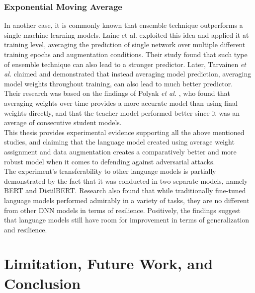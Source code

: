 \documentclass[%
	BCOR=8mm, %
	DIV=12,
	toc=bibliography, %
	toc=listof, %
	oneside, %
	egregdoesnotlikesansseriftitles, %
	]{scrbook}
\begin{document}
\subsection{Exponential Moving Average}
In another case, it is commonly known that ensemble technique outperforms a single machine learning models. Laine et al. \cite{laine_temporal_2017} exploited this idea and applied it at training level, averaging the prediction of single network over multiple different training epochs and augmentation conditions. Their study found that such type of ensemble technique can also lead to a stronger predictor. Later,  Tarvainen \textit{et al.}\cite{tarvainen_mean_2018} claimed and demonstrated that instead averaging model prediction, averaging model weights throughout training, can also lead to much better predictor. \\
Their research was based on the findings of Polyak \textit{et al.} \cite{polyak_acceleration_1992}, who found that averaging weights over time provides a more accurate model than using final weights directly, and that the teacher model performed better since it was an average of consecutive student models. \\
This thesis provides experimental evidence supporting all the above mentioned studies, and claiming that the language model created using average weight assignment and data augmentation creates a comparatively better and more robust model when it comes to defending against adversarial attacks.\\
The experiment's transferability to other language models is partially demonstrated by the fact that it was conducted in two separate models, namely BERT and DistilBERT. Research also found that while traditionally fine-tuned language models performed admirably in a variety of tasks, they are no different from other DNN models in terms of resilience. Positively, the findings suggest that language models still have room for improvement in terms of generalization and resilience.
\chapter{Limitation, Future Work, and Conclusion}
\label{chapter:conclusion}
\end{document}
